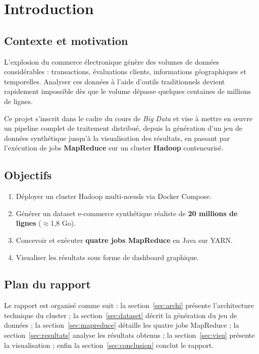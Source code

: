 \documentclass[12pt,a4paper]{article}
\begin{document}
\section{Introduction}

\subsection{Contexte et motivation}

L'explosion du commerce électronique génère des volumes de données considérables :
transactions, évaluations clients, informations géographiques et temporelles.
Analyser ces données à l'aide d'outils traditionnels devient rapidement impossible
dès que le volume dépasse quelques centaines de millions de lignes.

Ce projet s'inscrit dans le cadre du cours de \textit{Big Data} et vise à mettre
en œuvre un pipeline complet de traitement distribué, depuis la génération d'un
jeu de données synthétique jusqu'à la visualisation des résultats, en passant par
l'exécution de jobs \textbf{MapReduce} sur un cluster \textbf{Hadoop} conteneurisé.

\subsection{Objectifs}

\begin{enumerate}[leftmargin=*]
  \item Déployer un cluster Hadoop multi-nœuds via Docker Compose.
  \item Générer un dataset e-commerce synthétique réaliste de \textbf{20 millions
        de lignes} ($\approx$1,8 Go).
  \item Concevoir et exécuter \textbf{quatre jobs MapReduce} en Java sur YARN.
  \item Visualiser les résultats sous forme de dashboard graphique.
\end{enumerate}

\subsection{Plan du rapport}

Le rapport est organisé comme suit : la section~\ref{sec:archi} présente
l'architecture technique du cluster ; la section~\ref{sec:dataset} décrit la
génération du jeu de données ; la section~\ref{sec:mapreduce} détaille les quatre
jobs MapReduce ; la section~\ref{sec:resultats} analyse les résultats obtenus ;
la section~\ref{sec:visu} présente la visualisation ; enfin la
section~\ref{sec:conclusion} conclut le rapport.
\end{document}
